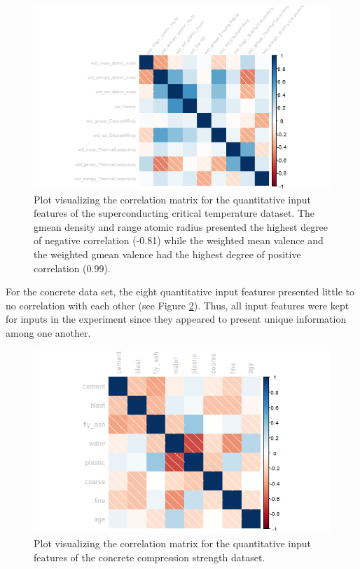 \documentclass[10pt]{article}\usepackage[]{graphicx}\usepackage[]{xcolor}
\begin{document}
\begin{figure}[htp]
  \centering
  \includegraphics[scale=0.8]{EDA/corrplot_conduct_trimmed.png}
  \caption{Plot visualizing the correlation matrix for the quantitative input features of the superconducting critical temperature dataset. The gmean density and range atomic radius presented the highest degree of negative correlation (-0.81) while the weighted mean valence and the weighted gmean valence had the highest degree of positive correlation (0.99).}
  \label{img:conduct_corrplot_trimmed}
\end{figure}

\newpage

For the concrete data set, the eight quantitative input features presented little to no correlation with each other (see Figure \ref{img:concrete_corrplot}). Thus, all input features were kept for inputs in the experiment since they appeared to present unique information among one another.

\begin{figure}[htp]
  \centering
  \includegraphics[scale=0.8]{EDA/corrplot_concrete.png}
  \caption{Plot visualizing the correlation matrix for the quantitative input features of the concrete compression strength dataset.}
  \label{img:concrete_corrplot}
\end{figure}
\end{document}
